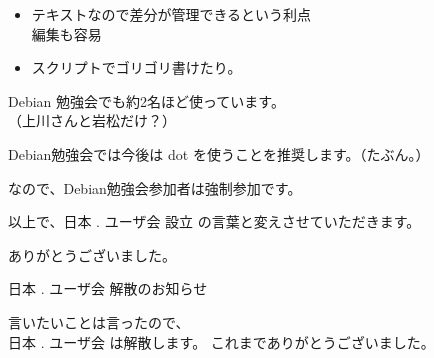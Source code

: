 \documentclass[cjk,dvipdfmx,20pt]{beamer}
\begin{document}
\begin{frame}{}
\begin{itemize}
 \item テキストなので差分が管理できるという利点\\
     編集も容易
 \item スクリプトでゴリゴリ書けたり。
\end{itemize}
\end{frame}

\begin{frame}{}
\begin{center}
Debian 勉強会でも約2名ほど使っています。\\
（上川さんと岩松だけ？）
\end{center}
\end{frame}

\begin{frame}{}
\begin{center}
Debian勉強会では今後は dot を使うことを推奨します。（たぶん。）
\end{center}
\end{frame}

\begin{frame}{}
\begin{center}
なので、Debian勉強会参加者は強制参加です。
\end{center}
\end{frame}

\begin{frame}{}
\begin{center}
以上で、日本 . ユーザ会 設立 の言葉と変えさせていただきます。
\end{center}
\end{frame}

\begin{frame}{}
\begin{center}
ありがとうございました。
\end{center}
\end{frame}

\begin{frame}{}
\begin{center}
日本 . ユーザ会 解散のお知らせ
\end{center}
\end{frame}

\begin{frame}{}
\begin{center}
言いたいことは言ったので、\\
日本 . ユーザ会 は解散します。
これまでありがとうございました。
\end{center}
\end{frame}
\end{document}
